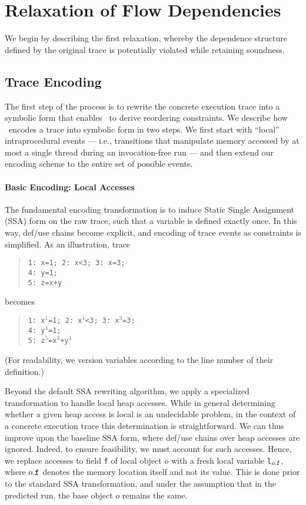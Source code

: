 \section{Relaxation of Flow Dependencies}


We begin by describing the first relaxation, whereby the dependence structure defined by the original trace is potentially violated while retaining soundness.

\subsection{Trace Encoding}

The first step of the process is to rewrite the concrete execution trace into a symbolic form that enables \tool\ to 
derive reordering constraints. We describe how \tool\ encodes a trace into symbolic form in two steps. We first start with ``local'' intraprocedural events --- i.e., 
transitions that manipulate memory accessed by at most a single thread during an invocation-free run --- and then extend our encoding scheme to the entire set of possible events.

\paragraph{Basic Encoding: Local Accesses}

The fundamental encoding transformation is to induce Static Single Assignment (SSA) form on the raw trace, such that
a variable is defined exactly once. In this way, def/use chains become explicit, and encoding of trace events as constraints is simplified. As an illustration, trace
\begin{quote}
	{\tt 1: x=1; 2: x<3; 3: x=3;} \\
	{\tt 4: y=1;} \\
	{\tt 5: z=x+y}
\end{quote}
becomes
\begin{quote}
	{\tt 1: x$^1$=1; 2: x$^1$<3; 3: x$^3$=3;} \\
	{\tt 4: y$^4$=1;} \\
	{\tt 5: z$^5$=x$^3$+y$^4$}
\end{quote}
(For readability, we version variables according to the line number of their definition.)

Beyond the default SSA rewriting algorithm, we apply a specialized transformation to handle local heap accesses. While in general determining whether a given heap access is local is an undecidable problem, in the context
of a concrete execution trace this determination is straightforward. We can thus improve upon the baseline SSA form, where def/use chains over heap accesses are ignored. Indeed, to ensure feasibility, we must account for such accesses. Hence, we replace accesses to field {\tt f} of local object $o$ with a fresh local variable {\tt l$_{o{\tt .f}}$}, where $o{\tt .f}$ denotes the memory location itself and not its value. This is done prior to the standard SSA transformation, and under the assumption that in the predicted run, the base object $o$ remains the same.

